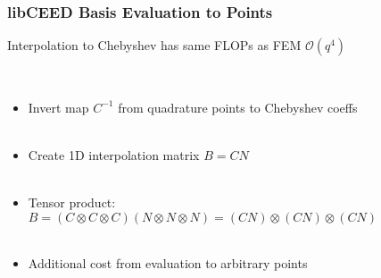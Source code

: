 \documentclass{beamer}
\begin{document}
\begin{frame}
\begin{center}
\frametitle{libCEED Basis Evaluation to Points}

Interpolation to Chebyshev has same FLOPs as FEM $\mathcal{O} \left( q^4 \right)$

~\\

\begin{itemize}

\item Invert map $C^{-1}$ from quadrature points to Chebyshev coeffs\\

~\\

\item Create 1D interpolation matrix $B = C N$\\

~\\

\item Tensor product: $B = \left( C \otimes C \otimes C \right) \left( N \otimes N \otimes N \right) = \left( C N \right) \otimes \left( C N \right) \otimes \left( C N \right)$\\

~\\

\item Additional cost from evaluation to arbitrary points\\

\end{itemize}

\end{center}
\end{frame}

\end{document}

